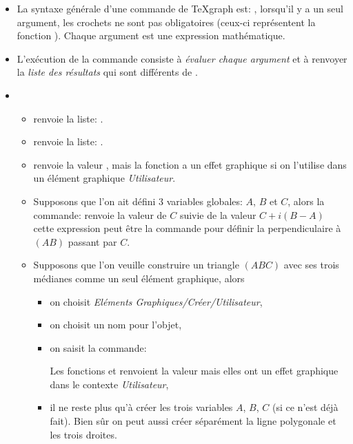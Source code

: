 \begin{itemize}

\item La syntaxe générale d'une commande de \TeX{graph} est: , lorsqu'il y a un seul argument, les crochets ne sont pas obligatoires (ceux-ci représentent la fonction ). Chaque argument est une expression mathématique.

\item L'exécution de la commande consiste à \textsl{évaluer chaque argument} et à renvoyer la \textsl{liste des résultats} qui sont différents de \Nil.

\item \exem 
    \begin{itemize}
    \item {} renvoie la liste: \res{[2,1+i,"toto",0.5]}.
    \item {} renvoie la liste: \res{[1,4,9,16,25]}.
    \item {} renvoie la valeur \Nil, mais la fonction   a un effet graphique si on l'utilise dans un élément graphique \textit{Utilisateur}.
    \item Supposons que l'on ait défini 3 variables globales: $A$, $B$ et $C$, alors la commande: \co{[C, C+i*(B-A)]} renvoie la valeur de $C$ suivie de la valeur $C+i(B-A)$  cette expression peut être la commande pour définir la perpendiculaire à $(AB)$ passant par $C$.
    \item Supposons que l'on veuille construire un triangle $(ABC)$ avec ses trois médianes comme un seul élément graphique, alors
        \begin{itemize}
        \item  on choisit \textit{Eléments Graphiques/Créer/Utilisateur},
         \item on choisit un nom pour l'objet,
        \item on saisit la commande:

 \centerline{} 

Les fonctions  et  renvoient la valeur \Nil mais elles ont un effet graphique dans le contexte \textit{Utilisateur},
         \item il ne reste plus qu'à créer les trois variables $A$, $B$, $C$ (si ce n'est déjà fait). Bien sûr on peut aussi créer séparément la ligne polygonale et les trois droites. 
        \end{itemize}
    \end{itemize}



\end{itemize}
